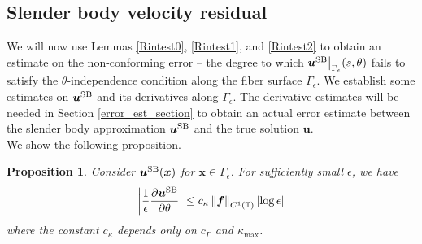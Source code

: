 \documentclass[11pt]{article}
\numberwithin{equation}{section}
\newcommand{\T}{\mathbb{T}}
\newcommand{\bu}{\bm{u}}
\newcommand{\bx}{\bm{x}}
\newcommand{\p}{\partial}
\newcommand{\SB}{{\rm SB}}
\newcommand{\abs}[1]{\left\lvert #1 \right\rvert}
\newcommand{\norm}[1]{\left\lVert #1 \right\rVert}
\newtheorem{proposition}[theorem]{Proposition}
\theoremstyle{definition}
\begin{document}
\subsection{Slender body velocity residual}\label{SB_vel}
We will now use Lemmas  \ref{Rintest0}, \ref{Rintest1}, and \ref{Rintest2} to obtain an estimate on the non-conforming error -- the degree to which $\bu^{\SB}\big|_{\Gamma_\epsilon}(s,\theta)$ fails to satisfy the $\theta$-independence condition along the fiber surface $\Gamma_\epsilon$. We establish some estimates on $\bu^{\SB}$ and its derivatives along $\Gamma_{\epsilon}$. The derivative estimates will be needed in Section \ref{error_est_section} to obtain an actual error estimate between the slender body approximation $\bu^{\SB}$ and the true solution $\bu$. \\

We show the following proposition. 
\begin{proposition}\label{prop:uSBtheta}
Consider $\bu^{\SB}(\bx)$ for $\bx \in \Gamma_\epsilon$. For sufficiently small $\epsilon$, we have
\begin{equation}
\abs{\frac{1}{\epsilon}\frac{\p\bu^{\SB}}{\p \theta}}\le c_\kappa\norm{\bm{f}}_{C^1(\T)}\abs{\log \epsilon} 
\end{equation}
where the constant $c_\kappa$ depends only on $c_\Gamma$ and $\kappa_{\max}$.
\end{proposition}
\end{document}
